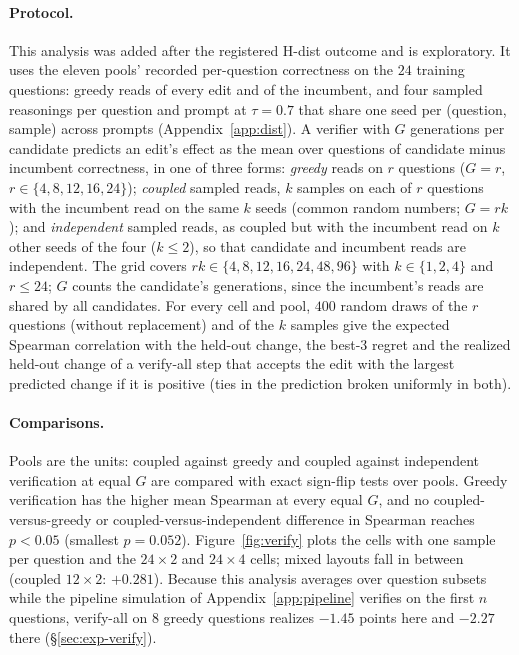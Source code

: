 \paragraph{Protocol.} This analysis was added after the registered H-dist outcome and is exploratory. It uses the
eleven pools' recorded per-question correctness on the $24$ training questions: greedy reads of
every edit and of the incumbent, and four sampled reasonings per question and prompt at
$\tau=0.7$ that share one seed per (question, sample) across prompts (Appendix~\ref{app:dist}).
A verifier with $G$ generations per candidate predicts an edit's effect as the mean over questions
of candidate minus incumbent correctness, in one of three forms:
\emph{greedy} reads on $r$ questions ($G=r$, $r\in\{4,8,12,16,24\}$); \emph{coupled} sampled reads,
$k$ samples on each of $r$ questions with the incumbent read on the same $k$ seeds (common random
numbers; $G=rk$); and \emph{independent} sampled reads, as coupled but with the incumbent read on
$k$ other seeds of the four ($k\le2$), so that candidate and incumbent reads are independent. The
grid covers $rk\in\{4,8,12,16,24,48,96\}$ with $k\in\{1,2,4\}$ and $r\le24$; $G$ counts the
candidate's generations, since the incumbent's reads are shared by all candidates. For every cell
and pool, $400$ random draws of the $r$ questions (without replacement) and of the $k$ samples
give the expected Spearman correlation with the held-out change, the best-3 regret and the
realized held-out change of a verify-all step that accepts the edit with the largest predicted
change if it is positive (ties in the prediction broken uniformly in both).

\paragraph{Comparisons.} Pools are the units: coupled against greedy and coupled against
independent verification at equal $G$ are compared with exact sign-flip tests over pools. Greedy
verification has the higher mean Spearman at every equal $G$,
and no coupled-versus-greedy or coupled-versus-independent difference in Spearman reaches
$p<0.05$ (smallest $p=0.052$). Figure~\ref{fig:verify} plots the cells with one sample per question
and the $24\times2$ and $24\times4$ cells; mixed layouts fall in between (coupled $12\times2$:
$+0.281$). Because this analysis averages over question subsets while the pipeline simulation of
Appendix~\ref{app:pipeline} verifies on the first $n$ questions, verify-all on $8$ greedy
questions realizes $-1.45$ points here and $-2.27$ there (\S\ref{sec:exp-verify}).

